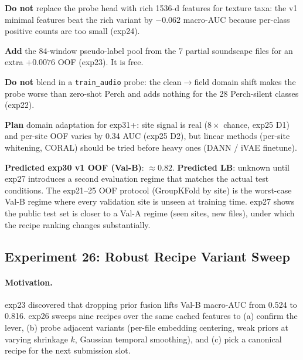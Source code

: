 \textbf{Do not} replace the probe head with rich 1536-d features for
texture taxa: the v1 minimal features beat the rich variant by
$-0.062$ macro-AUC because per-class positive counts are too small
(exp24).

\textbf{Add} the 84-window pseudo-label pool from the 7 partial
soundscape files for an extra $+0.0076$ OOF (exp23). It is free.

\textbf{Do not} blend in a \texttt{train\_audio} probe: the
clean$\to$field domain shift makes the probe worse than zero-shot
Perch and adds nothing for the 28 Perch-silent classes (exp22).

\textbf{Plan} domain adaptation for exp31+: site signal is real
($8\times$ chance, exp25 D1) and per-site OOF varies by 0.34 AUC
(exp25 D2), but linear methods (per-site whitening, CORAL) should
be tried before heavy ones (DANN / iVAE finetune).

\textbf{Predicted exp30 v1 OOF (Val-B)}: $\approx 0.82$. \textbf{Predicted
LB}: unknown until exp27 introduces a second evaluation regime that
matches the actual test conditions. The exp21--25 OOF protocol
(GroupKFold by site) is the worst-case Val-B regime where every
validation site is unseen at training time. exp27 shows the public
test set is closer to a Val-A regime (seen sites, new files), under
which the recipe ranking changes substantially.

\subsection{Experiment 26: Robust Recipe Variant Sweep}
\label{sec:exp26}

\paragraph{Motivation.} exp23 discovered that dropping prior fusion
lifts Val-B macro-AUC from 0.524 to 0.816. exp26 sweeps nine recipes
over the same cached features to (a) confirm the lever, (b) probe
adjacent variants (per-file embedding centering, weak priors at
varying shrinkage $k$, Gaussian temporal smoothing), and (c) pick a
canonical recipe for the next submission slot.

